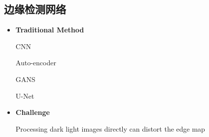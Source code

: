 \documentclass[CJK,aspectratio=169]{beamer}  %
\begin{document}
	\subsection{边缘检测网络}
	
	\begin{frame}
		
		\begin{itemize} 
			\item \textbf{Traditional Method}
			
			CNN
			
			Auto-encoder
			
			GANS
			
			U-Net
		\end{itemize}
		\begin{itemize} 
			\item \textbf{Challenge}
			
			Processing dark light images directly can distort the edge map
			
		\end{itemize}
	\end{frame}
	
\end{document}
